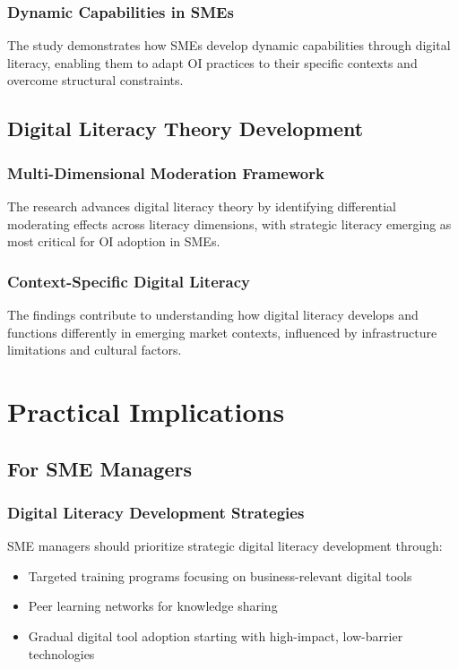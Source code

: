 \subsubsection{Dynamic Capabilities in SMEs}
The study demonstrates how SMEs develop dynamic capabilities through digital literacy, enabling them to adapt OI practices to their specific contexts and overcome structural constraints.

\subsection{Digital Literacy Theory Development}

\subsubsection{Multi-Dimensional Moderation Framework}
The research advances digital literacy theory by identifying differential moderating effects across literacy dimensions, with strategic literacy emerging as most critical for OI adoption in SMEs.

\subsubsection{Context-Specific Digital Literacy}
The findings contribute to understanding how digital literacy develops and functions differently in emerging market contexts, influenced by infrastructure limitations and cultural factors.

\section{Practical Implications}

\subsection{For SME Managers}

\subsubsection{Digital Literacy Development Strategies}
SME managers should prioritize strategic digital literacy development through:
\begin{itemize}
    \item Targeted training programs focusing on business-relevant digital tools
    \item Peer learning networks for knowledge sharing
    \item Gradual digital tool adoption starting with high-impact, low-barrier technologies
\end{itemize}

